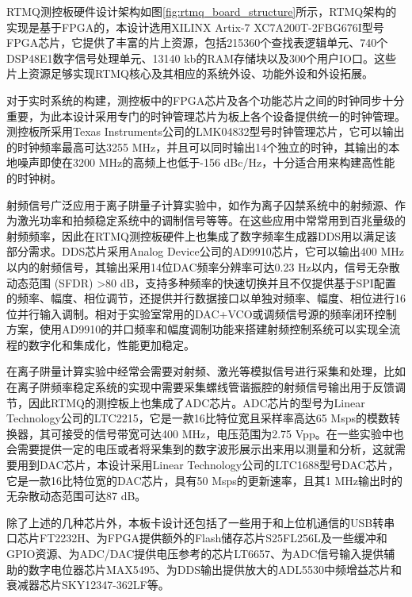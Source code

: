 RTMQ测控板硬件设计架构如图\ref{fig:rtmq_board_structure}所示，RTMQ架构的实现是基于FPGA的，本设计选用XILINX Artix-7 XC7A200T-2FBG676I\cite[]{7_Series_FPGAs_2020}型号FPGA芯片，它提供了丰富的片上资源，包括215360个查找表逻辑单元、740个DSP48E1数字信号处理单元、13140 kb的RAM存储块以及300个用户IO口。这些片上资源足够实现RTMQ核心及其相应的系统外设、功能外设和外设拓展。

对于实时系统的构建，测控板中的FPGA芯片及各个功能芯片之间的时钟同步十分重要，为此本设计采用专门的时钟管理芯片为板上各个设备提供统一的时钟管理。测控板所采用Texas Instruments公司的LMK04832\cite[]{lmk04832_2018}型号时钟管理芯片，它可以输出的时钟频率最高可达3255 MHz，并且可以同时输出14个独立的时钟，其输出的本地噪声即使在3200 MHz的高频上也低于-156 dBc/Hz，十分适合用来构建高性能的时钟树。


射频信号广泛应用于离子阱量子计算实验中，如作为离子囚禁系统中的射频源、作为激光功率和拍频稳定系统中的调制信号等等。在这些应用中常常用到百兆量级的射频频率，因此在RTMQ测控板硬件上也集成了数字频率生成器DDS用以满足该部分需求。DDS芯片采用Analog Device公司的AD9910\cite[]{AD9910_2020}芯片，它可以输出400 MHz以内的射频信号，其输出采用14位DAC频率分辨率可达0.23 Hz以内，信号无杂散动态范围 (SFDR) >80 dB，支持多种频率的快速切换并且不仅提供基于SPI配置的频率、幅度、相位调节，还提供并行数据接口以单独对频率、幅度、相位进行16位并行输入调制。相对于实验室常用的DAC+VCO或调频信号源的频率闭环控制方案，使用AD9910的并口频率和幅度调制功能来搭建射频控制系统可以实现全流程的数字化和集成化，性能更加稳定。


在离子阱量计算实验中经常会需要对射频、激光等模拟信号进行采集和处理，比如在离子阱频率稳定系统的实现中需要采集螺线管谐振腔的射频信号输出用于反馈调节，因此RTMQ的测控板上也集成了ADC芯片。ADC芯片的型号为Linear Technology公司的LTC2215\cite[]{ADC_2020}，它是一款16比特位宽且采样率高达65 Msps的模数转换器，其可接受的信号带宽可达400 MHz，电压范围为2.75 Vpp。在一些实验中也会需要提供一定的电压或者将采集到的数字波形展示出来用以测量和分析，这就需要用到DAC芯片，本设计采用Linear Technology公司的LTC1688型号DAC芯片，它是一款16比特位宽的DAC芯片，具有50 Msps的更新速率，且其1 MHz输出时的无杂散动态范围可达87 dB。

除了上述的几种芯片外，本板卡设计还包括了一些用于和上位机通信的USB转串口芯片FT2232H\cite[]{FT2232H_2020}、为FPGA提供额外的Flash储存芯片S25FL256L\cite[]{S25FL256L_2017}及一些缓冲和GPIO资源、为ADC/DAC提供电压参考的芯片LT6657\cite[]{LY6657_2020}、为ADC信号输入提供辅助的数字电位器芯片MAX5495\cite[]{MAX5495_2020}、为DDS输出提供放大的ADL5530\cite[]{ADL5530_2020}中频增益芯片和衰减器芯片SKY12347-362LF\cite[]{SKY12347_2011}等。

